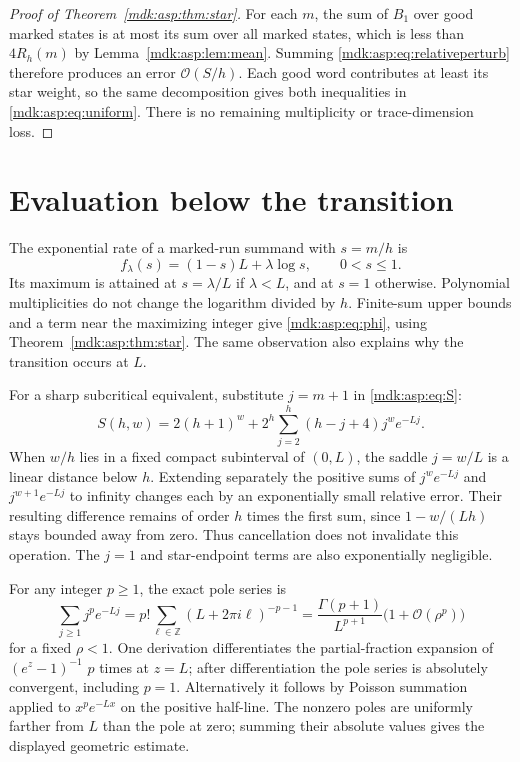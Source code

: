 \documentclass[11pt,letterpaper]{article}
\numberwithin{equation}{section}
\theoremstyle{remark}\newtheorem{remark}[theorem]{Remark}
\newcommand{\Oh}{\mathcal O}\newcommand{\Q}{\mathbb Q}\newcommand{\N}{\mathbb N}\newcommand{\R}{\mathbb R}
\begin{document}
\begin{proof}[Proof of Theorem~\ref{mdk:asp:thm:star}]
For each $m$, the sum of $B_1$ over good marked states is at most its sum over all marked states, which is less than $4R_h(m)$ by Lemma~\ref{mdk:asp:lem:mean}. Summing \eqref{mdk:asp:eq:relativeperturb} therefore produces an error $\Oh(S/h)$. Each good word contributes at least its star weight, so the same decomposition gives both inequalities in \eqref{mdk:asp:eq:uniform}. There is no remaining multiplicity or trace-dimension loss.
\end{proof}

\section{Evaluation below the transition}\label{mdk:asp:sec:sub}
The exponential rate of a marked-run summand with $s=m/h$ is
\[
f_\lambda(s)=(1-s)L+\lambda\log s,\qquad0<s\le1.
\]
Its maximum is attained at $s=\lambda/L$ if $\lambda<L$, and at $s=1$ otherwise. Polynomial multiplicities do not change the logarithm divided by $h$. Finite-sum upper bounds and a term near the maximizing integer give \eqref{mdk:asp:eq:phi}, using Theorem~\ref{mdk:asp:thm:star}. The same observation also explains why the transition occurs at $L$.

For a sharp subcritical equivalent, substitute $j=m+1$ in \eqref{mdk:asp:eq:S}:
\begin{equation}\label{mdk:asp:eq:Sj}
S(h,w)=2(h+1)^w+2^h\sum_{j=2}^h(h-j+4)j^w e^{-Lj}.
\end{equation}
When $w/h$ lies in a fixed compact subinterval of $(0,L)$, the saddle $j=w/L$ is a linear distance below $h$. Extending separately the positive sums of $j^w e^{-Lj}$ and $j^{w+1}e^{-Lj}$ to infinity changes each by an exponentially small relative error. Their resulting difference remains of order $h$ times the first sum, since $1-w/(Lh)$ stays bounded away from zero. Thus cancellation does not invalidate this operation. The $j=1$ and star-endpoint terms are also exponentially negligible.

For any integer $p\ge1$, the exact pole series is
\begin{equation}\label{mdk:asp:eq:polesum}
\sum_{j\ge1}j^p e^{-Lj}
=p!\sum_{\ell\in\mathbb Z}(L+2\pi i\ell)^{-p-1}
=\frac{\Gamma(p+1)}{L^{p+1}}\bigl(1+\Oh(\rho^p)\bigr)
\end{equation}
for a fixed $\rho<1$. One derivation differentiates the partial-fraction expansion of $(e^z-1)^{-1}$ $p$ times at $z=L$; after differentiation the pole series is absolutely convergent, including $p=1$. Alternatively it follows by Poisson summation applied to $x^pe^{-Lx}$ on the positive half-line. The nonzero poles are uniformly farther from $L$ than the pole at zero; summing their absolute values gives the displayed geometric estimate.
\end{document}
